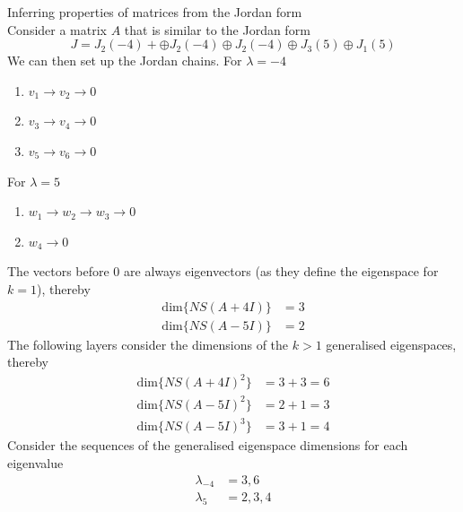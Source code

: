 \documentclass[journal, letterpaper]{IEEEtran}
\begin{document}
    \begin{myboxr}{Inferring properties of matrices from the Jordan form} \\ 
        Consider a matrix $A$ that is similar to the Jordan form
        $$ J = J_2(-4) + \oplus J_2(-4) \oplus J_2(-4) \oplus J_3(5) \oplus J_1(5)$$
        We can then set up the Jordan chains. For $\lambda = -4$
        \begin{enumerate}
            \item $v_1 \to v_2 \to 0$
            \item $v_3 \to v_4 \to 0$
            \item $v_5 \to v_6 \to 0$
        \end{enumerate}
        For $\lambda = 5$
        \begin{enumerate}
            \item $w_1 \to w_2 \to w_3 \to 0$
            \item $w_4 \to 0$
        \end{enumerate}
        The vectors before $0$ are always eigenvectors (as they define the eigenspace for $k = 1$), thereby 
        \begin{align*}
        \text{dim}\{NS(A + 4I)\} &= 3 \\
        \text{dim}\{NS(A - 5I)\} &= 2
        \end{align*}
        The following layers consider the dimensions of the $k > 1$ generalised eigenspaces, thereby
        \begin{align*}
            \text{dim}\{NS(A + 4I)^2\} &= 3 + 3 = 6\\
            \text{dim}\{NS(A - 5I)^2\} &= 2 + 1 = 3 \\
            \text{dim}\{NS(A - 5I)^3\} &= 3 + 1 = 4
        \end{align*}
        Consider the sequences of the generalised eigenspace dimensions for each eigenvalue
        \begin{align*}
            \lambda_{-4} &= 3, 6 \\ 
            \lambda_{5} &= 2, 3, 4
        \end{align*}
    \end{myboxr}
\end{document}
